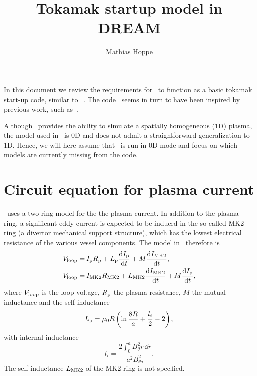 \documentclass{notes}
\title{Tokamak startup model in DREAM}
\author{Mathias Hoppe}
\newcommand{\IMK}{I_{\rm MK2}}
\newcommand{\Ip}{I_{\rm p}}
\newcommand{\Vl}{V_{\rm loop}}
\newcommand{\Rp}{R_{\rm p}}
\begin{document}
    \maketitle

    In this document we review the requirements for \DREAM\ to function as a
    basic tokamak start-up code, similar to \DYON~\cite{Kim2012}. The code
    \DYON\ seems in turn to have been inspired by previous work, such
    as~\cite{Lloyd1996}.

    Although \DREAM\ provides the ability to simulate a spatially homogeneous
    (1D) plasma, the model used in \DYON\ is 0D and does not admit a
    straightforward generalization to 1D. Hence, we will here assume that
    \DREAM\ is run in 0D mode and focus on which models are currently missing
    from the code.

    \tableofcontents

    \section{Circuit equation for plasma current}
    \DYON\ uses a two-ring model for the the plasma current. In addition to the
    plasma ring, a significant eddy current is expected to be induced in the
    so-called MK2 ring (a divertor mechanical support structure), which has the
    lowest electrical resistance of the various vessel components. The model in
    \DYON\ therefore is
    \begin{subequations}\label{eq:dyonV}
        \begin{align}
            \Vl &= \Ip\Rp + L_{\rm p}\frac{\dd\Ip}{\dd t} + M\frac{\dd\IMK}{\dd t},\label{eq:dyonVp}\\
            \Vl &= \IMK R_{\rm MK2} + L_{\rm MK2}\frac{\dd\IMK}{\dd t} + M\frac{\dd\Ip}{\dd t},\label{eq:VloopMK2}
        \end{align}
    \end{subequations}
    where $\Vl$ is the loop voltage, $\Rp$ the plasma resistance, $M$ the
    mutual inductance and the self-inductance
    \begin{equation}
        L_{\rm p} = \mu_0 R\left( \ln\frac{8R}{a} + \frac{l_i}{2} - 2 \right),
    \end{equation}
    with internal inductance
    \begin{equation}
        l_i = \frac{2\int_0^a B_\theta^2 r\,\dd r}{a^2 B_{\theta a}^2}.
    \end{equation}
    The self-inductance $L_{\rm MK2}$ of the MK2 ring is not specified.
\end{document}
